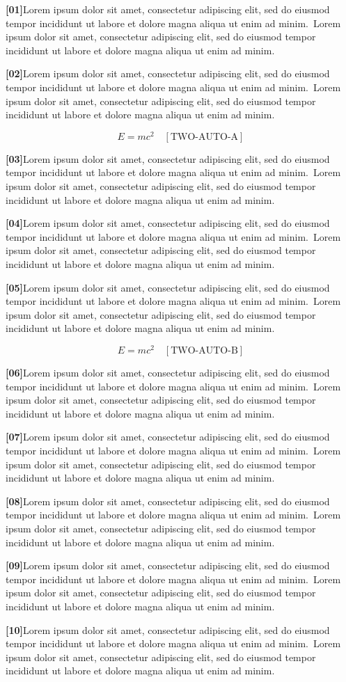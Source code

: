 \documentclass[twocolumn]{article}
\newcommand\Body{Lorem ipsum dolor sit amet, consectetur adipiscing elit, sed do
eiusmod tempor incididunt ut labore et dolore magna aliqua ut enim ad minim.}
\newcommand\Par[1]{\par\noindent\textbf{[#1]}\space\Body\ \Body\par\medskip}
\begin{document}
\Par{01}\Par{02}
\begin{wideband}\[ E=mc^2 \quad[\text{TWO-AUTO-A}] \]\end{wideband}
\Par{03}\Par{04}\Par{05}
\begin{wideband}\[ E=mc^2 \quad[\text{TWO-AUTO-B}] \]\end{wideband}
\Par{06}\Par{07}\Par{08}\Par{09}\Par{10}
\end{document}
